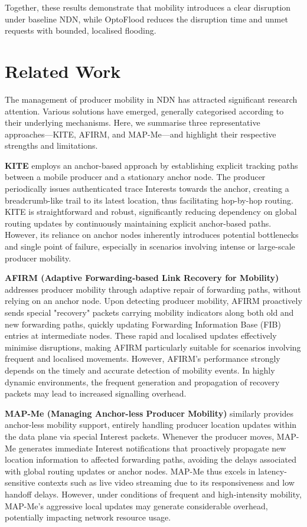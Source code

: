 \documentclass[10pt,conference]{IEEEtran}
\begin{document}
Together, these results demonstrate that mobility introduces a clear disruption under baseline NDN, while OptoFlood reduces the disruption time and unmet requests with bounded, localised flooding.

\section{Related Work}
\label{sec:related}

The management of producer mobility in NDN has attracted significant research attention. Various solutions have emerged, generally categorised according to their underlying mechanisms. Here, we summarise three representative approaches—KITE, AFIRM, and MAP-Me—and highlight their respective strengths and limitations.

\textbf{KITE} \cite{KITE} employs an anchor-based approach by establishing explicit tracking paths between a mobile producer and a stationary anchor node. The producer periodically issues authenticated trace Interests towards the anchor, creating a breadcrumb-like trail to its latest location, thus facilitating hop-by-hop routing. KITE is straightforward and robust, significantly reducing dependency on global routing updates by continuously maintaining explicit anchor-based paths. However, its reliance on anchor nodes inherently introduces potential bottlenecks and single point of failure, especially in scenarios involving intense or large-scale producer mobility.

\textbf{AFIRM (Adaptive Forwarding-based Link Recovery for Mobility)} \cite{AFIRM} addresses producer mobility through adaptive repair of forwarding paths, without relying on an anchor node. Upon detecting producer mobility, AFIRM proactively sends special "recovery" packets carrying mobility indicators along both old and new forwarding paths, quickly updating Forwarding Information Base (FIB) entries at intermediate nodes. These rapid and localised updates effectively minimise disruptions, making AFIRM particularly suitable for scenarios involving frequent and localised movements. However, AFIRM's performance strongly depends on the timely and accurate detection of mobility events. In highly dynamic environments, the frequent generation and propagation of recovery packets may lead to increased signalling overhead.

\textbf{MAP-Me (Managing Anchor-less Producer Mobility)} \cite{MAPME} similarly provides anchor-less mobility support, entirely handling producer location updates within the data plane via special Interest packets. Whenever the producer moves, MAP-Me generates immediate Interest notifications that proactively propagate new location information to affected forwarding paths, avoiding the delays associated with global routing updates or anchor nodes. MAP-Me thus excels in latency-sensitive contexts such as live video streaming due to its responsiveness and low handoff delays. However, under conditions of frequent and high-intensity mobility, MAP-Me's aggressive local updates may generate considerable overhead, potentially impacting network resource usage.
\end{document}
